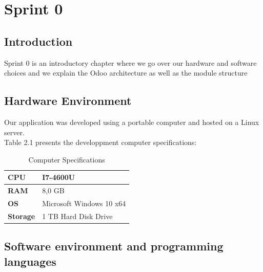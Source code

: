 \chapter{Sprint 0}

\section*{Introduction}
   Sprint 0 is an introductory chapter where we go over our hardware and software choices and we explain the Odoo architecture as well as the module structure

\section{Hardware Environment}

Our application was developed using a portable computer and hosted on a Linux server.\\
\noindent Table 2.1 presents the developpment computer specifications: 
\begin{table}[H]
\centering
\caption{Computer Specifications}
\label{my-label}
\begin{tabular}{|p{}|p{}|}
\hline
\textbf{CPU} & I7-4600U\\
\hline
\textbf{RAM} & 8,0 GB   \\
\hline
\textbf{OS} & Microsoft Windows 10 x64 \\
\hline
\textbf{Storage} & 1 TB Hard Disk Drive \\
\hline

\end{tabular}
\end{table}






\section{Software environment and programming languages}

